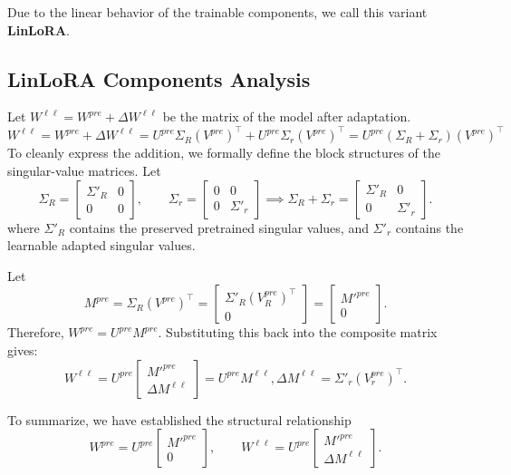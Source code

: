 \documentclass{article}
\begin{document}
Due to the linear behavior of the trainable components, we call this variant \textbf{LinLoRA}.

\subsection{LinLoRA Components Analysis}

Let $W^{\ell \ell} = W^{pre} + \Delta W^{\ell \ell}$ be the matrix of the model after adaptation.
\[
W^{\ell \ell}
= W^{pre} + \Delta W^{\ell \ell}
= U^{pre}\Sigma_R (V^{pre})^\top + U^{pre} \Sigma_r (V^{pre})^\top
= U^{pre}(\Sigma_R + \Sigma_r)(V^{pre})^\top
\]
To cleanly express the addition, we formally define the block structures of the singular-value matrices. Let
\[
\Sigma_R =
\begin{bmatrix}
\Sigma'_R & 0 \\
0 & 0
\end{bmatrix},
\qquad
\Sigma_r =
\begin{bmatrix}
0 & 0 \\
0 & \Sigma'_r
\end{bmatrix}
\implies
\Sigma_R + \Sigma_r
=
\begin{bmatrix}
\Sigma'_R & 0 \\
0 & \Sigma'_r
\end{bmatrix}.
\]
where $\Sigma'_R$ contains the preserved pretrained singular values, and $\Sigma'_r$ contains the learnable adapted singular values.

Let
\[
M^{pre}
=
\Sigma_R(V^{pre})^\top
=
\begin{bmatrix}
\Sigma'_R (V_R^{pre})^\top \\
0
\end{bmatrix}
=
\begin{bmatrix}
M'^{pre} \\
0
\end{bmatrix}.
\]
Therefore, $W^{pre}=U^{pre}M^{pre}$. Substituting this back into the composite matrix gives:
\[
W^{\ell \ell}
=
U^{pre}
\begin{bmatrix}
M'^{pre} \\
\Delta M^{\ell \ell}
\end{bmatrix}
=
U^{pre}M^{\ell \ell},
\Delta M^{\ell \ell}
=
\Sigma'_r (V_r^{pre})^\top.
\]

To summarize, we have established the structural relationship
\[
W^{pre}
=
U^{pre}
\begin{bmatrix}
M'^{pre} \\
0
\end{bmatrix},
\qquad
W^{\ell \ell}
=
U^{pre}
\begin{bmatrix}
M'^{pre} \\
\Delta M^{\ell \ell}
\end{bmatrix}.
\]
\end{document}
